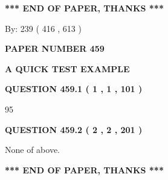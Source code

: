 \documentclass[12pt]{article}
\begin{document}
 
 
 
   
   
 \vspace{0.2in}
 
   
   
   
   
\vspace{1.0in} 
{\textbf{\large{ *** END OF PAPER, THANKS *** }}} 
   
   
\hspace{1.0in} By: 
 239 ( 416 ,  613 )
   
   
   
   
\newpage 
\setcounter{page}{ 
   459001 } 
   
   
   
   
 {\textbf{ \Large{ PAPER NUMBER  459  }}}
   
   
\vspace{0.2in}
   
   
   
   
   
   
 \vspace{0.2in}
{\LARGE {\textbf{ A QUICK TEST EXAMPLE}}}
   
   
  
\vspace{0.2in}
  
{\textbf{\Large{QUESTION
459.1 
 ( 1 , 1 , 101 )
}}}
  
  
 
 
\noindent{}

95
 
 
  
\vspace{0.2in}
  
{\textbf{\Large{QUESTION
459.2 
 ( 2 , 2 , 201 )
}}}
  
  
 
 
\noindent{}
 
 
 None of above.
 
 
 
 
   
   
 \vspace{0.2in}
 
   
   
   
   
\vspace{1.0in} 
{\textbf{\large{ *** END OF PAPER, THANKS *** }}} 
   
\end{document}
